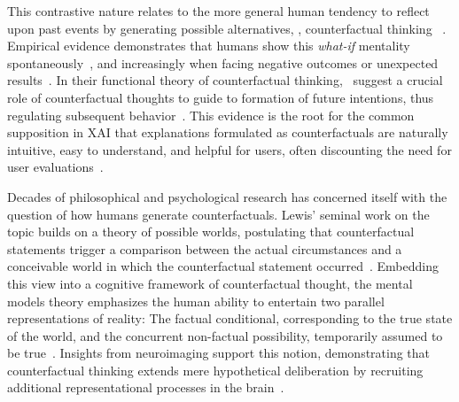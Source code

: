 This contrastive nature relates to the more general human tendency to reflect upon past events by generating possible alternatives, \ie, counterfactual thinking ~\citep{roese_counterfactual_1997}.
Empirical evidence demonstrates that humans show this \textit{what-if} mentality spontaneously~\citep{goldinger_blaming_2003}, and increasingly when facing negative outcomes or unexpected results~\citep{sanna_antecedents_1996}.
In their functional theory of counterfactual thinking,~\citeauthor{roese_functional_2017} suggest a crucial role of counterfactual thoughts to guide to formation of future intentions, thus regulating subsequent behavior~\citep{roese_functional_2017,epstude_functional_2008}.
This evidence is the root for the common supposition in \gls{XAI} that explanations formulated as counterfactuals are naturally intuitive, easy to understand, and helpful for users, often discounting the need for user evaluations~\citep{stepin_paving_2019, dandl_multi-objective_2020, guidotti_local_2018, artelt_counterfactual_2020, artelt_efficient_2022}.

Decades of philosophical and psychological research has concerned itself with the question of how humans generate counterfactuals. 
Lewis' seminal work on the topic builds on a theory of possible worlds, postulating that counterfactual statements trigger a comparison between the actual circumstances and a conceivable world in which the counterfactual statement occurred~\citep{lewis_counterfactuals_1973}.
Embedding this view into a cognitive framework of counterfactual thought, the mental models theory emphasizes the human ability to entertain two parallel representations of reality: The factual conditional, corresponding to the true state of the world, and the concurrent non-factual possibility, temporarily assumed to be true~\citep{byrne_mental_2002,byrne_precis_2007,johnson-laird_conditionals_2002,walsh_mental_2005}.
Insights from neuroimaging support this notion, demonstrating that counterfactual thinking extends mere hypothetical deliberation by recruiting additional representational processes in the brain~\citep{kulakova_processing_2013}.

